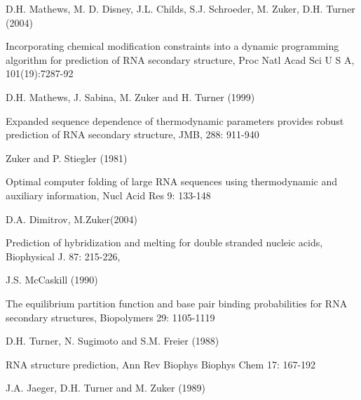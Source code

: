 
\begin{DoxyEnumerate}
\item 
\end{DoxyEnumerate}

\label{mp__ref_mathews_04}
\hypertarget{mp__ref_mathews_04}{}
 D.H. Mathews, M. D. Disney, J.L. Childs, S.J. Schroeder, M. Zuker, D.H. Turner (2004)\par
 Incorporating chemical modification constraints into a dynamic programming algorithm for prediction of RNA secondary structure, Proc Natl Acad Sci U S A, 101(19):7287-\/92
\begin{DoxyEnumerate}
\item \label{mp__ref_mathews_99}
\hypertarget{mp__ref_mathews_99}{}
 D.H. Mathews, J. Sabina, M. Zuker and H. Turner (1999)\par
 Expanded sequence dependence of thermodynamic parameters provides robust prediction of RNA secondary structure, JMB, 288: 911-\/940
\begin{DoxyEnumerate}
\item \label{mp__ref_zuker_81}
\hypertarget{mp__ref_zuker_81}{}
 Zuker and P. Stiegler (1981)\par
 Optimal computer folding of large RNA sequences using thermodynamic and auxiliary information, Nucl Acid Res 9: 133-\/148
\begin{DoxyEnumerate}
\item \label{mp__ref_dimitrov_04}
\hypertarget{mp__ref_dimitrov_04}{}
 D.A. Dimitrov, M.Zuker(2004)\par
 Prediction of hybridization and melting for double stranded nucleic acids, Biophysical J. 87: 215-\/226,
\begin{DoxyEnumerate}
\item \label{mp__ref_mccaskill_90}
\hypertarget{mp__ref_mccaskill_90}{}
 J.S. McCaskill (1990)\par
 The equilibrium partition function and base pair binding probabilities for RNA secondary structures, Biopolymers 29: 1105-\/1119
\begin{DoxyEnumerate}
\item \label{mp__ref_turner_88}
\hypertarget{mp__ref_turner_88}{}
 D.H. Turner, N. Sugimoto and S.M. Freier (1988)\par
 RNA structure prediction, Ann Rev Biophys Biophys Chem 17: 167-\/192
\begin{DoxyEnumerate}
\item \label{mp__ref_jaeger_89}
\hypertarget{mp__ref_jaeger_89}{}
 J.A. Jaeger, D.H. Turner and M. Zuker (1989)\par

\end{DoxyEnumerate}
\end{DoxyEnumerate}
\end{DoxyEnumerate}
\end{DoxyEnumerate}
\end{DoxyEnumerate}
\end{DoxyEnumerate}
